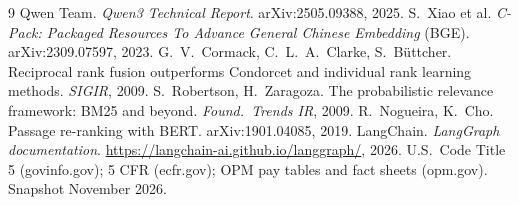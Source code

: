 \documentclass[11pt,a4paper]{article}
\begin{document}
\small
\begin{thebibliography}{9}\setlength{\itemsep}{0pt}
 Qwen Team. \emph{Qwen3 Technical Report}. arXiv:2505.09388, 2025.
 S.~Xiao et al. \emph{C-Pack: Packaged Resources To Advance General Chinese Embedding} (BGE). arXiv:2309.07597, 2023.
 G.~V.~Cormack, C.~L.~A.~Clarke, S.~B\"uttcher. Reciprocal rank fusion outperforms Condorcet and individual rank learning methods. \emph{SIGIR}, 2009.
 S.~Robertson, H.~Zaragoza. The probabilistic relevance framework: BM25 and beyond. \emph{Found.\ Trends IR}, 2009.
 R.~Nogueira, K.~Cho. Passage re-ranking with BERT. arXiv:1901.04085, 2019.
 LangChain. \emph{LangGraph documentation}. \url{https://langchain-ai.github.io/langgraph/}, 2026.
 U.S.\ Code Title 5 (govinfo.gov); 5 CFR (ecfr.gov); OPM pay tables and fact sheets (opm.gov). Snapshot November 2026.
\end{thebibliography}
\end{document}
